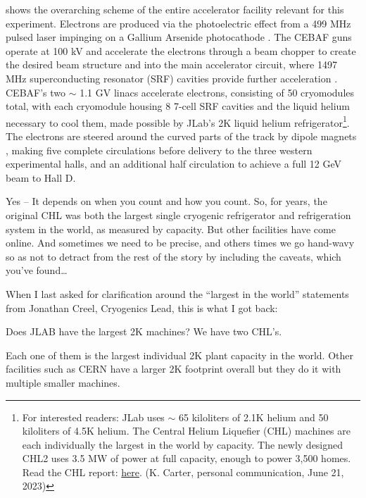      shows the overarching scheme of the entire accelerator facility relevant for this experiment. Electrons are produced via the photoelectric effect from a 499 MHz pulsed laser impinging on a Gallium Arsenide photocathode . The CEBAF guns operate at 100 kV and accelerate the electrons through a beam chopper  to create the desired beam structure  and into the main accelerator circuit, where 1497 MHz superconducting resonator (SRF) cavities provide further acceleration . CEBAF's two $\sim$ 1.1 GV linacs accelerate electrons, consisting of 50 cryomodules total, with each cryomodule housing 8 7-cell SRF cavities and the liquid helium necessary to cool them, made possible by JLab's 2K liquid helium refrigerator\footnote{For interested readers: JLab uses $\sim$ 65 kiloliters of 2.1K helium and 50 kiloliters of 4.5K helium. The Central Helium Liquefier (CHL) machines are each individually the largest in the world by capacity. The newly designed CHL2 uses 3.5 MW of power at full capacity, enough to power 3,500 homes. Read the CHL report: \href{https://misportal.jlab.org/ul/publications/view_pub.cfm?pub_id=13998}{here}. (K. Carter, personal communication, June 21, 2023) }. The electrons are steered around the curved parts of the track by dipole magnets , making five complete circulations before delivery to the three western experimental halls, and an additional half circulation to achieve a full 12 GeV beam to Hall D. 

    \iffalse  
    Yes – It depends on when you count and how you count. So, for years, the original CHL was both the largest single cryogenic refrigerator and refrigeration system in the world, as measured by capacity. But other facilities have come online. And sometimes we need to be precise, and others times we go hand-wavy so as not to detract from the rest of the story by including the caveats, which you’ve found…
     
    When I last asked for clarification around the “largest in the world” statements from Jonathan Creel, Cryogenics Lead, this is what I got back:
    
    Does JLAB have the largest 2K machines? We have two CHL’s.
    
    Each one of them is the largest individual 2K plant capacity in the world. Other facilities such as CERN have a larger 2K footprint overall but they do it with multiple smaller machines.
        
